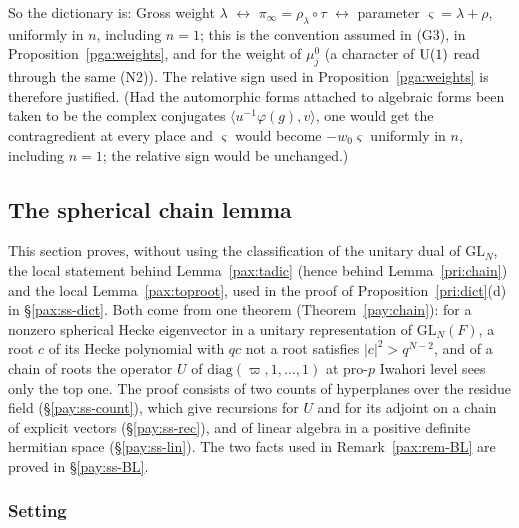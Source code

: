 \documentclass[10pt]{amsart}
\theoremstyle{definition}
\theoremstyle{remark}
\begin{document}
So the dictionary is: Gross weight $\lambda$ $\leftrightarrow$ $\pi_\infty=\rho_\lambda\circ\tau$
$\leftrightarrow$ parameter $\varsigma=\lambda+\rho$, uniformly in $n$, including $n=1$; this is the
convention assumed in (G3), in Proposition~\ref{pga:weights}, and for the weight of $\mu^0_j$ (a
character of $\auU(1)$ read through the same (N2)). The relative sign used in
Proposition~\ref{pga:weights} is therefore justified. (Had the automorphic forms attached to
algebraic forms been taken to be the complex conjugates $\langle u^{-1}\varphi(g),v\rangle$, one would get the
contragredient at every place and $\varsigma$ would become $-w_0\varsigma$ uniformly in $n$, including
$n=1$; the relative sign would be unchanged.)



\providecommand{\auO}{\mathcal O}
\providecommand{\auGL}{\mathrm{GL}}
\providecommand{\auF}{\mathbb F}
\providecommand{\auU}{\mathrm U}
\providecommand{\auNm}{\operatorname{Nm}}
\providecommand{\pgtr}{\operatorname{tr}}
\providecommand{\pgFrob}{\operatorname{Frob}}
\providecommand{\payL}{\Lambda}
\providecommand{\payM}{\mathsf M}
\providecommand{\payU}{\mathbf U}
\providecommand{\payUd}{\mathbf U'}
\providecommand{\payN}{\mathcal N}

\subsection{The spherical chain lemma}\label{pay:sec}

This section proves, without using the classification of the unitary dual of $\auGL_N$, the local
statement behind Lemma~\ref{pax:tadic} (hence behind Lemma~\ref{pri:chain}) and the local
Lemma~\ref{pax:toproot}, used in the proof of Proposition~\ref{pri:dict}(d) in \S\ref{pax:ss-dict}. Both come from one theorem (Theorem~\ref{pay:chain}): for a nonzero
spherical Hecke eigenvector in a unitary representation of $\auGL_N(F)$, a root $c$ of its Hecke
polynomial with $qc$ not a root satisfies $|c|^2>q^{N-2}$, and of a chain of roots the operator $U$
of $\mathrm{diag}(\varpi,1,\dots,1)$ at pro-$p$ Iwahori level sees only the top one. The proof
consists of two counts of hyperplanes over the residue field (\S\ref{pay:ss-count}), which give
recursions for $U$ and for its adjoint on a chain of explicit vectors (\S\ref{pay:ss-rec}), and of
linear algebra in a positive definite hermitian space (\S\ref{pay:ss-lin}). The two facts used in
Remark~\ref{pax:rem-BL} are proved in \S\ref{pay:ss-BL}.

\subsubsection{Setting}\label{pay:ss-set}
\end{document}
